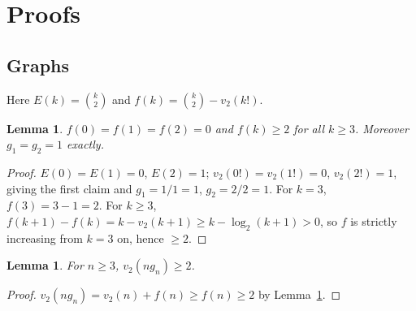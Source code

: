 \documentclass[11pt]{article}
\newtheorem{lemma}[theorem]{Lemma}
\theoremstyle{definition}
\begin{document}
\section{Proofs}\label{sec:proofs}

\subsection{Graphs}
Here $E(k)=\binom{k}{2}$ and $f(k)=\binom{k}{2}-v_2(k!)$.
\begin{lemma}\label{lem:fgraph}
$f(0)=f(1)=f(2)=0$ and $f(k) \ge 2$ for all $k \ge 3$.
Moreover $g_1 = g_2 = 1$ exactly.
\end{lemma}
\begin{proof}
$E(0)=E(1)=0$, $E(2)=1$; $v_2(0!)=v_2(1!)=0$, $v_2(2!)=1$, giving the
first claim and $g_1 = 1/1 = 1$, $g_2 = 2/2 = 1$.
For $k=3$, $f(3)=3-1=2$. For $k\ge 3$,
$f(k+1)-f(k) = k - v_2(k+1) \ge k - \log_2(k+1) > 0$,
so $f$ is strictly increasing from $k=3$ on, hence $\ge 2$.
\end{proof}

\begin{lemma}\label{lem:ngraph}
For $n \ge 3$, $v_2(n g_n) \ge 2$.
\end{lemma}
\begin{proof}
$v_2(n g_n) = v_2(n) + f(n) \ge f(n) \ge 2$ by Lemma~\ref{lem:fgraph}.
\end{proof}
\end{document}
